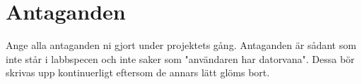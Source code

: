 \section{Antaganden}
Ange alla antaganden ni gjort under projektets gång. Antaganden är sådant som inte står i labbspecen och inte saker som "användaren har datorvana". Dessa bör skrivas upp kontinuerligt eftersom de annars lätt glöms bort.

